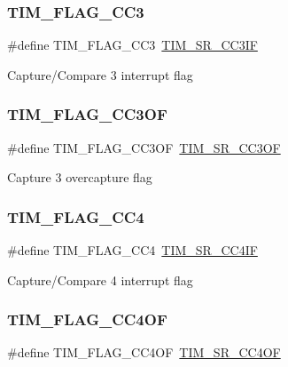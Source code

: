 \subsubsection{\texorpdfstring{TIM\_FLAG\_CC3}{TIM\_FLAG\_CC3}}
{\footnotesize\ttfamily \#define T\+I\+M\+\_\+\+F\+L\+A\+G\+\_\+\+C\+C3~\mbox{\hyperlink{group___peripheral___registers___bits___definition_gad3cf234a1059c0a04799e88382cdc0f2}{T\+I\+M\+\_\+\+S\+R\+\_\+\+C\+C3\+IF}}}

Capture/\+Compare 3 interrupt flag \mbox{\label{group___t_i_m___flag__definition_gac81f24eaffdf83c2db9d2e6078a00919}} 
\subsubsection{\texorpdfstring{TIM\_FLAG\_CC3OF}{TIM\_FLAG\_CC3OF}}
{\footnotesize\ttfamily \#define T\+I\+M\+\_\+\+F\+L\+A\+G\+\_\+\+C\+C3\+OF~\mbox{\hyperlink{group___peripheral___registers___bits___definition_gaf7a2d4c831eb641ba082156e41d03358}{T\+I\+M\+\_\+\+S\+R\+\_\+\+C\+C3\+OF}}}

Capture 3 overcapture flag \mbox{\label{group___t_i_m___flag__definition_gafd0dc57b56941f8b8250d66e289542db}} 
\subsubsection{\texorpdfstring{TIM\_FLAG\_CC4}{TIM\_FLAG\_CC4}}
{\footnotesize\ttfamily \#define T\+I\+M\+\_\+\+F\+L\+A\+G\+\_\+\+C\+C4~\mbox{\hyperlink{group___peripheral___registers___bits___definition_gacade8a06303bf216bfb03140c7e16cac}{T\+I\+M\+\_\+\+S\+R\+\_\+\+C\+C4\+IF}}}

Capture/\+Compare 4 interrupt flag \mbox{\label{group___t_i_m___flag__definition_gafc8b04654766d98ba2c6fed601895a20}} 
\subsubsection{\texorpdfstring{TIM\_FLAG\_CC4OF}{TIM\_FLAG\_CC4OF}}
{\footnotesize\ttfamily \#define T\+I\+M\+\_\+\+F\+L\+A\+G\+\_\+\+C\+C4\+OF~\mbox{\hyperlink{group___peripheral___registers___bits___definition_ga81ba979e8309b66808e06e4de34bc740}{T\+I\+M\+\_\+\+S\+R\+\_\+\+C\+C4\+OF}}}

